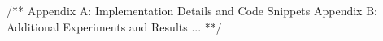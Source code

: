 /** 
Appendix A: Implementation Details and Code Snippets
Appendix B: Additional Experiments and Results
...
**/